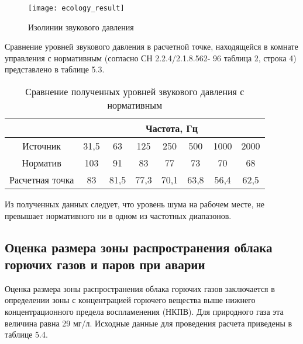 \begin{figure}[H]
	\centering
	\texttt{[image: ecology\_result]}
	\caption{Изолинии звукового давления}
	\label{img:ecology_result}
\end{figure}

Сравнение уровней звукового давления в расчетной точке, находящейся в комнате управления с нормативным (согласно СН 2.2.4/2.1.8.562-
96 таблица 2, строка 4) представлено в таблице 5.3.

\begin{longtable}{|c|c|c|c|c|c|c|c|}
	\caption{Сравнение полученных уровней звукового давления с нормативным} \label{tab:ecology_noise_norm}
	\hline
	\multicolumn{1}{|c}{}& \multicolumn{7}{c|}{Частота, Гц} \\ \hline
	Источник & 31,5 & 63 & 125 & 250 & 500 & 1000 & 2000 \\ \hline
	Норматив & 103 & 91 & 83 & 77 & 73 & 70 & 68 \\ \hline
	Расчетная точка & 83 & 81,5 & 77,3 & 70,1 & 63,8 & 56,4 & 62,5 \\ \hline
\end{longtable}

Из полученных данных следует, что уровень шума на рабочем месте, не превышает нормативного ни в одном из частотных диапазонов.

\subsection{Оценка размера зоны распространения облака горючих газов и паров при аварии} %
\label{sub:ecology_cloud}

Оценка размера зоны распространения облака горючих газов заключается в определении зоны с концентрацией горючего вещества выше нижнего концентрационного предела воспламенения (НКПВ). Для природного газа эта величина равна 29 мг/л.
Исходные данные для проведения расчета приведены в таблице 5.4.

